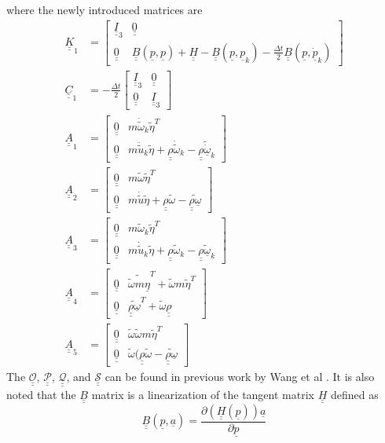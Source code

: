 \documentclass{aiaa-tc}
\newcommand{\tens}[1]{\underline{\underline{#1}}}
\renewcommand{\vec}[1]{\underline{#1}}
\begin{document}
where the newly introduced matrices are
\begin{align}
   \label{K1}
   \tens{K}_1 &=
   \begin{bmatrix}
   \tens{I}_3 & \tens{0} \\
   \tens{0} & \tens{B}(\vec{p},\vec{p}) + \tens{H} - \tens{B}(\vec{p},\vec{p}_k) -\frac{\Delta t}{2} \tens{B}(\vec{p},\vec{\dot{p}}_k)
   \end{bmatrix} \\
   \label{C1}
   \tens{C}_1 &=
   -\frac{\Delta t}{2} \begin{bmatrix}
   \tens{I}_3 & \tens{0} \\
   \tens{0} & \tens{I}_3 
   \end{bmatrix} \\
   \label{A1}
   \tens{A}_1 &=
    \begin{bmatrix}
   \tens{0} & m \dot{\tilde{\omega}}_k \tilde{\eta}^T \\
   \tens{0} & m \ddot{\tilde{u}}_k \tilde{\eta}+\tens{\rho} \dot{\tilde{\omega}}_k-\widetilde{\tens{\rho}{\dot{\vec{\omega}}_k}}
   \end{bmatrix} \\
   \label{A2}
   \tens{A}_2 &=
    \begin{bmatrix}
   \tens{0} & m \tilde{\omega} \tilde{\eta}^T \\
   \tens{0} & m \dot{\tilde{u}} \tilde{\eta}+\tens{\rho} \tilde{\omega}-\widetilde{\tens{\rho}\vec{\omega} }
   \end{bmatrix} \\
   \label{A3}
   \tens{A}_3 &=
    \begin{bmatrix}
   \tens{0} & m \tilde{\omega}_k \tilde{\eta}^T \\
   \tens{0} & m \dot{\tilde{u}}_k \tilde{\eta}+\tens{\rho} \tilde{\omega}_k-\widetilde{\tens{\rho}\vec{\omega}_k}
   \end{bmatrix} \\
   \label{A4}
   \tens{A}_4 &=
    \begin{bmatrix}
   \tens{0} & \widetilde{\tilde{\omega}m\vec{\eta}}^T+\tilde{\omega}m\tilde{\eta}^T \\
   \tens{0} & \widetilde{\tens{\rho}\vec{\omega}}^T+\tilde{\omega}\tens{\rho}
   \end{bmatrix} \\
   \label{A5}
   \tens{A}_5 &=
    \begin{bmatrix}
   \tens{0} & \tilde{\omega} \tilde{\omega} m \tilde{\eta}^T \\
   \tens{0} & \tilde{\omega} (\tens{\rho} \tilde{\omega} - \widetilde{\tens{\rho} \vec{\omega}}
   \end{bmatrix} 
\end{align}
The $\tens{\mathcal{O}}$, $\tens{\mathcal{P}}$, $\tens{\mathcal{Q}}$, and $\tens{\mathcal{S}}$ can be found in previous work by Wang et al \cite{Wang:GEBT2014}. It is also noted that the $\tens{B}$ matrix is a linearization of the tangent matrix $\tens{H}$ defined as
\begin{equation}
    \label{Bmatrix}
    \tens{B}(\vec{p},\vec{a}) = \frac{\partial (\tens{H}(\vec{p})) \vec{a}}{\partial \vec{p}}
\end{equation}
\end{document}
